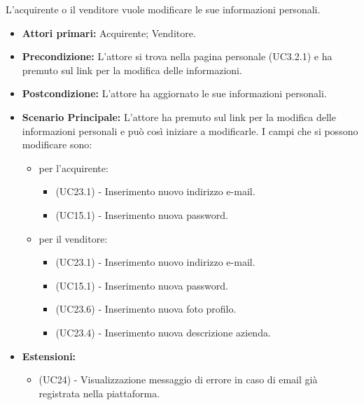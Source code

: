 L'acquirente o il venditore vuole modificare le sue informazioni personali.
\begin{itemize}
    \item \textbf{Attori primari:} Acquirente; Venditore.
    \item \textbf{Precondizione:} L'attore si trova nella pagina personale (UC3.2.1) e ha premuto sul link per la modifica delle informazioni.
    \item \textbf{Postcondizione:} L'attore ha aggiornato le sue informazioni personali.
    \item \textbf{Scenario Principale:} L'attore ha premuto sul link per la modifica delle informazioni personali e può così iniziare a modificarle. I campi che si possono modificare sono:
    \begin{itemize}
        \item per l'acquirente:
        \begin{itemize}
            \item (UC23.1) - Inserimento nuovo indirizzo e-mail.
            \item (UC15.1) - Inserimento nuova password.
        \end{itemize}
        \item per il venditore:
        \begin{itemize}
            \item (UC23.1) - Inserimento nuovo indirizzo e-mail.
            \item (UC15.1) - Inserimento nuova password.
            \item (UC23.6) - Inserimento nuova foto profilo.
            \item (UC23.4) - Inserimento nuova descrizione azienda.
        \end{itemize}
    \end{itemize}
    \item \textbf{Estensioni:}
    \begin{itemize}
        \item (UC24) - Visualizzazione messaggio di errore in caso di email già registrata nella piattaforma.
    \end{itemize}
\end{itemize}

\resetSubUC

\label{UC15.1}

